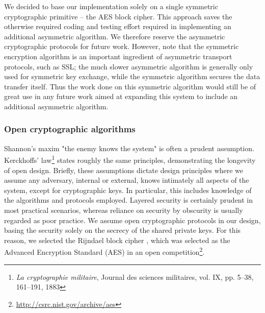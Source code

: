 We decided to base our implementation solely on a single symmetric cryptographic primitive -- the AES block cipher. This approach saves the otherwise required coding and testing effort required in implementing an additional asymmetric algorithm. We therefore reserve the asymmetric cryptographic protocols for future work. However, note that the symmetric encryption algorithm is an important ingredient of asymmetric transport protocols, such as SSL; the much slower asymmetric algorithm is generally only used for symmetric key exchange, while the symmetric algorithm secures the data transfer itself. Thus the work done on this symmetric algorithm would still be of great use in any future work aimed at expanding this system to include an additional asymmetric algorithm.


\subsubsection{Open cryptographic algorithms}

Shannon's maxim "the enemy knows the system" is often a prudent assumption. Kerckhoffs' law\footnote{\textit{La cryptographie militaire}, Journal des sciences militaires, vol. IX, pp. 5--38, 161–191, 1883} states roughly the same principles, demonstrating the longevity of open design. Briefly, these assumptions dictate design principles where we assume any adversary, internal or external, knows intimately all aspects of the system, except for cryptographic keys. In particular, this includes knowledge of the algorithms and protocols employed. Layered security is certainly prudent in most practical scenarios, whereas reliance on security by obscurity is usually regarded as poor practice. We assume open cryptographic protocols in our design, basing the security solely on the secrecy of the shared private keys. For this reason, we selected the Rijndael block cipher , which was selected as the Advanced Encryption Standard (AES) in an open competition\footnote{\url{http://csrc.nist.gov/archive/aes}}.

